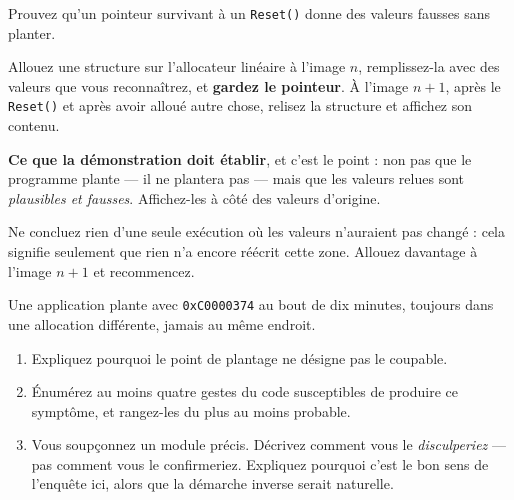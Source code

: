 \begin{nkdemo}
Prouvez qu'un pointeur survivant à un \texttt{Reset()} donne des valeurs fausses
sans planter.

Allouez une structure sur l'allocateur linéaire à l'image $n$, remplissez-la avec
des valeurs que vous reconnaîtrez, et \textbf{gardez le pointeur}. À l'image
$n+1$, après le \texttt{Reset()} et après avoir alloué autre chose, relisez la
structure et affichez son contenu.

\textbf{Ce que la démonstration doit établir}, et c'est le point : non pas que le
programme plante --- il ne plantera pas --- mais que les valeurs relues sont
\emph{plausibles et fausses}. Affichez-les à côté des valeurs d'origine.

\alerte{} Ne concluez rien d'une seule exécution où les valeurs n'auraient pas changé :
cela signifie seulement que rien n'a encore réécrit cette zone. Allouez
davantage à l'image $n+1$ et recommencez.
\end{nkdemo}

\begin{nklogique}
Une application plante avec \texttt{0xC0000374} au bout de dix minutes, toujours
dans une allocation différente, jamais au même endroit.

\begin{enumerate}
\item Expliquez pourquoi le point de plantage ne désigne pas le coupable.
\item Énumérez au moins quatre gestes du code susceptibles de produire ce
      symptôme, et rangez-les du plus au moins probable.
\item Vous soupçonnez un module précis. Décrivez comment vous le
      \emph{disculperiez} --- pas comment vous le confirmeriez. Expliquez
      pourquoi c'est le bon sens de l'enquête ici, alors que la démarche
      inverse serait naturelle.
\end{enumerate}
\end{nklogique}
